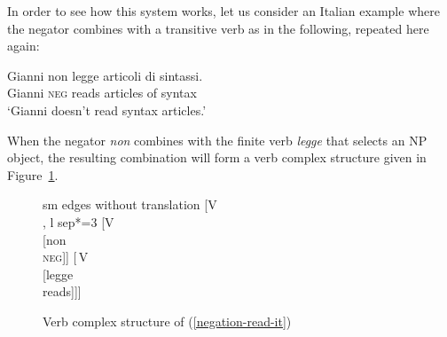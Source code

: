 \documentclass[output=paper
                ,modfonts
                ,nonflat
	        ,collection
	        ,collectionchapter
	        ,collectiontoclongg
 	        ,biblatex
                ,babelshorthands
                ,newtxmath
                ,draftmode
                ,colorlinks, citecolor=brown
]{./langsci/langscibook}
\begin{document}
{\begin{exe}
\begin{xlist}
In order to see how
this system works, let us consider an Italian example where
the negator combines with a transitive verb as in the
following, repeated here again:

\begin{exe}
\ex
\label{negation-read-it}
\gll Gianni non legge articoli di sintassi.\\
Gianni \textsc{neg} reads articles of syntax\\
\glt `Gianni doesn't read syntax articles.'
\end{exe}

\noindent
When the negator \textit{non} combines with the finite verb \textit{legge} that
selects an NP object, the resulting combination will form
a verb complex structure given in Figure~\ref{negation-read-it-st}.

\begin{figure}
	\begin{forest}
sm edges without translation
		[V\\
		, l sep*=3
			[V\\
				[non\\ \textsc\textsc{neg}]]
			[\,V\\
					[legge\\ reads]]]
	\end{forest}
\caption{Verb complex structure of (\ref{negation-read-it})}\label{negation-read-it-st}
\end{figure}




\end{xlist}
\end{exe}}
\end{document}
